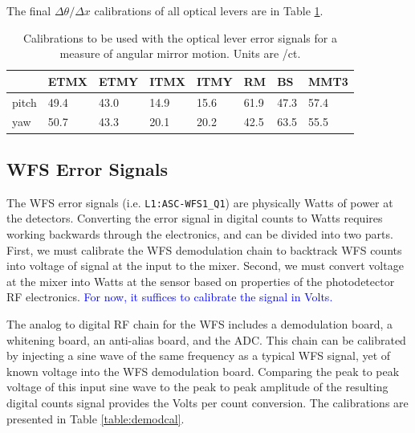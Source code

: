 The final $\Delta\theta / \Delta x$ calibrations of all optical levers
are in Table \ref{table:oplevcal}. 

\begin{table}
\centering
\caption[Optical lever calibrations]{Calibrations to be used
  with the optical lever error signals 
  for a measure of angular mirror motion. Units are \microrad/ct.}
\begin{tabular}{l l l l l l l l}
\hline
        & ETMX & ETMY & ITMX & ITMY & RM & BS & MMT3 \\
\hline
pitch & 49.4 & 43.0 & 14.9 & 15.6 & 61.9 & 47.3 & 57.4 \\
yaw & 50.7 & 43.3 & 20.1 & 20.2 & 42.5 & 63.5 & 55.5 \\
\hline
\end{tabular}
\label{table:oplevcal}
\end{table}





\subsection{WFS Error Signals}
The WFS error signals (i.e. \texttt{L1:ASC-WFS1\_Q1}) are physically
Watts of power at the detectors. Converting the error signal in
digital counts to Watts requires working backwards through the
electronics, and can be divided into two parts. First, we must
calibrate the WFS demodulation chain to backtrack WFS counts into
voltage of signal at the input to the mixer. Second, we must convert
voltage at the mixer into Watts at the sensor based on properties of
the photodetector RF electronics. \textcolor{blue}{For now, it
  suffices to calibrate the signal in Volts.}

The analog to digital RF chain for the WFS includes a demodulation
board, a whitening board, an anti-alias board, and the ADC. This chain
can be calibrated by injecting a sine wave of the same frequency as a
typical WFS signal, yet of known voltage into the WFS demodulation
board. Comparing the peak to peak voltage of this input sine wave to
the peak to peak amplitude of the resulting digital counts signal
provides the Volts per count conversion. The calibrations are
presented in Table \ref{table:demodcal}.

